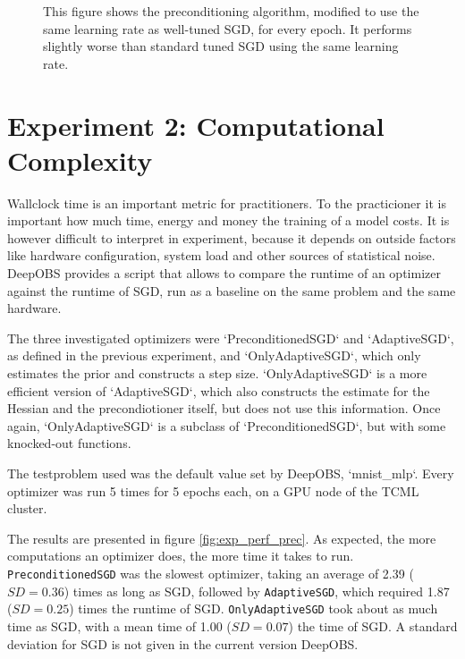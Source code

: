 \documentclass[twoside,12pt,a4paper]{report}
\begin{document}
\begin{figure}
	
	\caption{This figure shows the preconditioning algorithm, modified to use the same learning rate as well-tuned SGD, for every epoch. It performs slightly worse than standard tuned SGD using the same learning rate.}
	\label{fig:exp_tunedalpha}
\end{figure}

\section{Experiment 2: Computational Complexity}
\begin{markdown}
Wallclock time is an important metric for practitioners. To the practicioner it is important how much time, energy and money the training of a model costs. It is however difficult to interpret in experiment, because it depends on outside factors like hardware configuration, system load and other sources of statistical noise. DeepOBS provides a script that allows to compare the runtime of an optimizer against the runtime of SGD, run as a baseline on the same problem and the same hardware.

The three investigated optimizers were `PreconditionedSGD` and `AdaptiveSGD`, as defined in the previous experiment, and `OnlyAdaptiveSGD`, which only estimates the prior and constructs a step size. `OnlyAdaptiveSGD` is a more efficient version of `AdaptiveSGD`, which also constructs the estimate for the Hessian and the precondiotioner itself, but does not use this information. Once again, `OnlyAdaptiveSGD` is a subclass of `PreconditionedSGD`, but with some knocked-out functions.

The testproblem used was the default value set by DeepOBS, `mnist_mlp`. Every optimizer was run 5 times for 5 epochs each, on a GPU node of the TCML cluster.
\end{markdown}

The results are presented in figure \ref{fig:exp_perf_prec}. As expected, the more computations an optimizer does, the more time it takes to run.
\verb|PreconditionedSGD| was the slowest optimizer, taking an average of 2.39 ($SD = 0.36$) times as long as SGD, followed by \verb|AdaptiveSGD|, which required 1.87 ($SD = 0.25$) times the runtime of SGD. \verb|OnlyAdaptiveSGD| took about as much time as SGD, with a mean time of 1.00 ($SD = 0.07$) the time of SGD. A standard deviation for SGD is not given in the current version DeepOBS.
\end{document}

